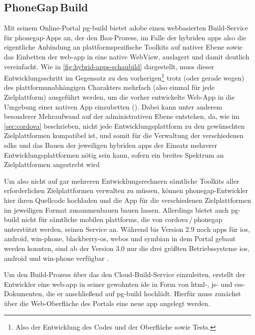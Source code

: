 {\subsection{PhoneGap\,Build}

Mit seinem Online-Portal \gls{pg-build} bietet \gls{adobe} einen webbasierten Build-Service für \gls{phonegap}-Apps an, der den Bau-Prozess, im Falle der hybriden \glspl{app} also die eigentliche Anbindung an plattformspezifische Toolkits auf nativer Ebene sowie das Einbetten der \gls{web-app} in eine native WebView, auslagert und damit deutlich vereinfacht.
Wie in \autoref{fig:hybrid-apps-schaubild} dargestellt, muss dieser Entwicklungsschritt im Gegensatz zu den vorherigen\footnote{Also der Entwicklung des Codes und der Oberfläche sowie Tests.} trotz (oder gerade wegen) des plattformunabhängigen Charakters mehrfach (also einmal für jede Zielplattform) ausgeführt werden, um die vorher entwickelte Web-App in die Umgebung einer nativen App einzubetten ().
Dabei kann unter anderem besonderer Mehraufwand auf der administrativen Ebene entstehen, da, wie im \autoref{sec:cordova} beschrieben, nicht jede Entwicklungsplattform zu den gewünschten Zielplattformen kompatibel ist, und somit für die Verwaltung der verschiedenen \glspl{sdk} und das Bauen der jeweiligen hybriden \glspl{app} der Einsatz mehrerer Entwicklungsplattformen nötig sein kann, sofern ein breites Spektrum an Zielplattformen angestrebt wird

Um also nicht auf gar mehreren Entwicklungsrechnern sämtliche Toolkits aller erforderlichen Zielplattformen verwalten zu müssen, können \gls{phonegap}-Entwickler hier ihren Quellcode hochladen und die App für die verschiedenen Zielplattformen im jeweiligen Format zusammenbauen bauen lassen.
Allerdings bietet auch \gls{pg-build} nicht für sämtliche mobilen \glspl{plattform}, die von \gls{cordova}\,/\,\gls{phonegap} unterstützt werden, seinen Service an.
Während bis Version 2.9 noch \glspl{app} für \gls{ios}, \gls{android}, \gls{win-phone}, \gls{blackberry-os}, \gls{webos} und \gls{symbian} in dem Portal gebaut werden konnten,
sind ab der Version 3.0 nur die drei größten Betriebssysteme \gls{ios}, \gls{android} und \gls{win-phone} verfügbar \cite{PhoneGap_Build_Documentation_Supported-Platforms}. 

Um den Build-Prozess über das den Cloud-Build-Service einzuleiten, erstellt der Entwickler eine \gls{web-app} in seiner gewohnten \gls{ide} in Form von \gls{html}-, \gls{js}- und \gls{css}-Dokumenten, die er anschließend auf \gls{pg-build} hochlädt.
Hierfür muss zunächst über die Web-Oberfläche des Portals eine neue \gls{app} angelegt werden.

}
